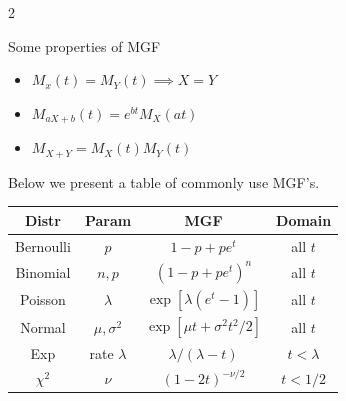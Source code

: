 \begin{multicols}{2}
\begin{remark}
\end{remark}

\begin{theorem}
Some properties of MGF
\begin{itemize}
    \item $M_x(t) = M_Y(t) \implies X = Y$
\item $M_{aX+b}(t) = e^{bt}M_X(at)$
    \item $M_{X+Y} = M_X(t) M_Y(t)$
\end{itemize}
\end{theorem}
Below we present a table of commonly use MGF's. 
\begin{tabular}{c|c|c|c}
    Distr& Param & MGF & Domain \\
    \hline\hline
    Bernoulli & $p$ & $1 - p + pe^t$ & all $t$ \\
    Binomial & $n, p$ & $(1 - p + pe^t)^n$ & all $t$ \\
    Poisson & $\lambda$ & $\exp{[\lambda(e^t - 1)]}$ & all $t$ \\
    Normal & $\mu, \sigma^2$ & $\exp[\mu t + \sigma^2t^2/2]$ & all $t$\\
    Exp & rate $\lambda$ & $\lambda / (\lambda - t)$ & $t < \lambda$ \\
    $\chi^2$ & $\nu$ & $(1 - 2t)^{-\nu/2}$ & $t < 1/2$
\end{tabular}
\end{multicols}